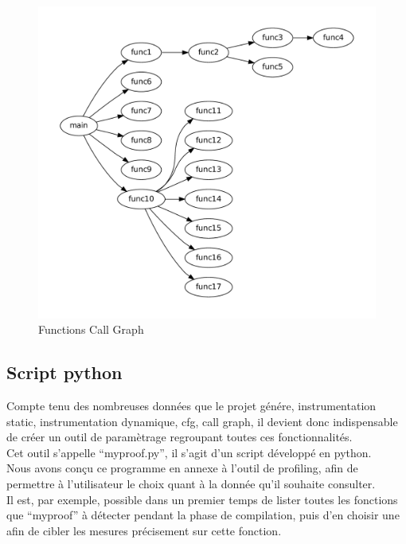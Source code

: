 \begin{figure}[here]
  \centering
  \includegraphics[scale=0.50]{images/CallGraph}
  \caption{Functions Call Graph}
  \label{fig:call_graph}
\end{figure}

\subsection{Script python}

Compte tenu des nombreuses données que le projet génére, instrumentation static, instrumentation dynamique, cfg, call graph, il devient donc indispensable de créer un outil de paramètrage regroupant toutes ces fonctionnalités.\\

Cet outil s'appelle ``myproof.py'', il s'agit d'un script développé en python.\\

Nous avons conçu ce programme en annexe à l'outil de profiling, afin de permettre à l'utilisateur le choix quant à la donnée qu'il souhaite consulter.\\

Il est, par exemple, possible dans un premier temps de lister toutes les fonctions que ``myproof'' à détecter pendant la phase de compilation, puis d'en choisir une afin de cibler les mesures précisement sur cette fonction.\\

